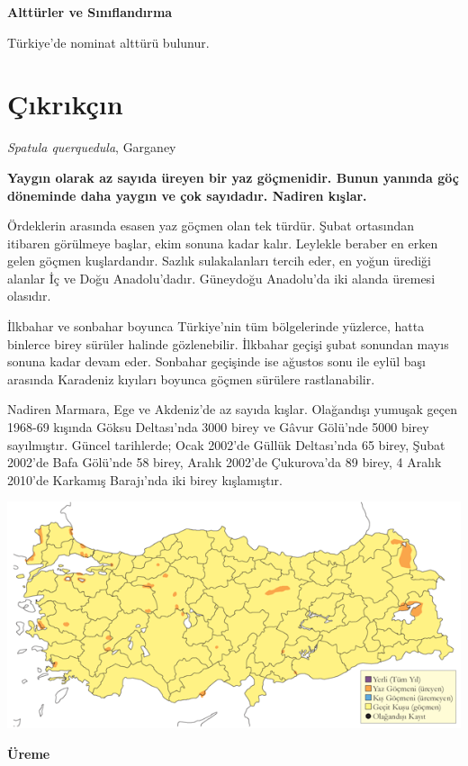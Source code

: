\documentclass[
  a4paper,
  DIV=11,
  numbers=noendperiod]{scrreprt}
\begin{document}
\textbf{Alttürler ve Sınıflandırma}

Türkiye'de nominat alttürü bulunur.

\section{Çıkrıkçın}\label{uxe7ux131krux131kuxe7ux131n}

\emph{Spatula querquedula}, Garganey

\textbf{Yaygın olarak az sayıda üreyen bir yaz göçmenidir. Bunun yanında
göç döneminde daha yaygın ve çok sayıdadır. Nadiren kışlar.}

Ördeklerin arasında esasen yaz göçmen olan tek türdür. Şubat ortasından
itibaren görülmeye başlar, ekim sonuna kadar kalır. Leylekle beraber en
erken gelen göçmen kuşlardandır. Sazlık sulakalanları tercih eder, en
yoğun ürediği alanlar İç ve Doğu Anadolu'dadır. Güneydoğu Anadolu'da iki
alanda üremesi olasıdır.

İlkbahar ve sonbahar boyunca Türkiye'nin tüm bölgelerinde yüzlerce,
hatta binlerce birey sürüler halinde gözlenebilir. İlkbahar geçişi şubat
sonundan mayıs sonuna kadar devam eder. Sonbahar geçişinde ise ağustos
sonu ile eylül başı arasında Karadeniz kıyıları boyunca göçmen sürülere
rastlanabilir.

Nadiren Marmara, Ege ve Akdeniz'de az sayıda kışlar. Olağandışı yumuşak
geçen 1968-69 kışında Göksu Deltası'nda 3000 birey ve Gâvur Gölü'nde
5000 birey sayılmıştır. Güncel tarihlerde; Ocak 2002'de Güllük
Deltası'nda 65 birey, Şubat 2002'de Bafa Gölü'nde 58 birey, Aralık
2002'de Çukurova'da 89 birey, 4 Aralık 2010'de Karkamış Barajı'nda iki
birey kışlamıştır.

\includegraphics{images/harita_Page_019.png}

\textbf{Üreme}
\end{document}
